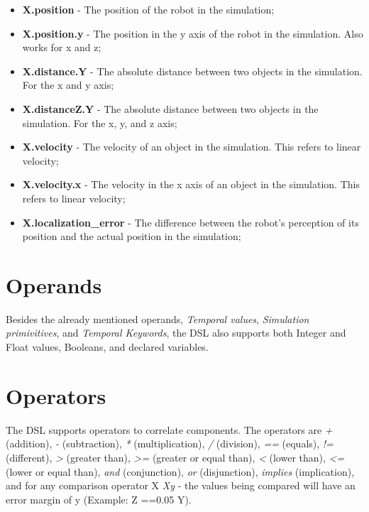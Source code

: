 \begin{itemize}
\item {\bfseries X.position} - The position of the robot in the simulation;
\item {\bfseries X.position.y} - The position in the y axis of the robot in the simulation. Also works for x and z;
\item {\bfseries X.distance.Y} - The absolute distance between two objects in the simulation. For the x and y axis;
\item {\bfseries X.distanceZ.Y} - The absolute distance between two objects in the simulation. For the x, y, and z axis;
\item {\bfseries X.velocity} - The velocity of an object in the simulation. This refers to linear velocity;
\item {\bfseries X.velocity.x} - The velocity in the x axis of an object in the simulation. This refers to linear velocity;
\item {\bfseries X.localization\_error} - The difference between the robot's perception of its position and the actual position in the simulation;
\end{itemize}

\section{Operands}

Besides the already mentioned operands, \textit{Temporal values}, \textit{Simulation primivitives}, and \textit{Temporal Keywords}, the DSL also supports both Integer and Float values, Booleans, and declared variables.

\section{Operators}

The DSL supports operators to correlate components. The operators are \textit{+} (addition), \textit{-} (subtraction), \textit{*} (multiplication), \textit{/} (division), \textit{==} (equals), \textit{!=} (different), \textit{>} (greater than), \textit{>=} (greater or equal than), \textit{<} (lower than), \textit{<=} (lower or equal than), \textit{and} (conjunction), \textit{or} (disjunction), \textit{implies} (implication), and for any comparison operator X \textit{X{y}} - the values being compared will have an error margin of y (Example: Z =={0.05} Y).

